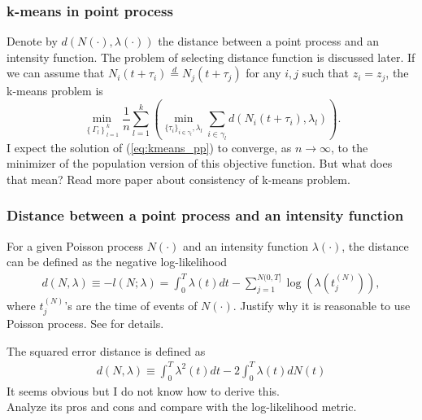 		\subsubsection*{k-means in point process}
			Denote by $d(N(\cdot), \lambda(\cdot))$ the distance between a point process and an intensity function. The problem of selecting distance function is discussed later.
			{\color{red} If we can assume that $N_i(t+\tau_i)\overset{d}{=}N_j(t+\tau_j)$ for any $i,j$ such that $z_i=z_j$,}
			the k-means problem is
			\begin{equation}\label{eq:kmeans_pp}
			\min_{\left\{ \Gamma_l \right\}_{l=1}^k} \frac{1}{n} \sum_{l=1}^k \left(\min_{\{\tau_i\}_{i\in\gamma_l},\lambda_l} \sum_{i\in\gamma_l} d(N_i(t+\tau_i), \lambda_l) \right).
			\end{equation}
			I expect the solution of (\ref{eq:kmeans_pp}) to converge, as $n\to\infty$, to the minimizer of the population version of this objective function. {\color{red}But what does that mean?}
			{\color{blue} Read more paper about consistency of k-means problem.}
		\subsubsection*{Distance between a point process and an intensity function}
			For a given Poisson process $N(\cdot)$ and an intensity function $\lambda(\cdot)$, the distance can be defined as the negative log-likelihood
			\begin{align*}
			d(N, \lambda) \equiv -l(N;\lambda) = \int_{0}^T\lambda(t)dt - \sum_{j=1}^{N(0,T]}\log \left( \lambda(t_j^{(N)}) \right) ,
			\end{align*}
			where $t_j^{(N)}$'s are the time of events of $N(\cdot)$.			
			{\color{blue} Justify why it is reasonable to use Poisson process. }
	 		See \citet{Daley} for details.

			The squared error distance is defined as 
			\begin{align*}
			d(N,\lambda) \equiv \int_0^T\lambda^2(t)dt - 2\int_0^T \lambda(t)dN(t)
			\end{align*}
			{\color{red} It seems obvious but I do not know how to derive this.}
			\\			
			{\color{blue} Analyze its pros and cons and compare with the log-likelihood metric.}



